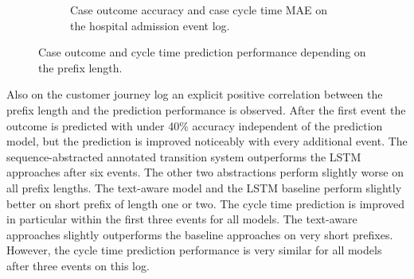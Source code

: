 \begin{figure}[!htbp]
\begin{subfigure}{\textwidth}
		\caption{Case outcome accuracy and case cycle time MAE on the hospital admission event log.}
	\end{subfigure}
	\caption[Case outcome and cycle time prediction performance depending on the prefix length]{Case outcome and cycle time prediction performance depending on the prefix length.}
	\label{fig:outcome-cycle-time-prefix}
\end{figure}


Also on the customer journey log an explicit positive correlation between the prefix length and the prediction performance is observed.
After the first event the outcome is predicted with under 40\% accuracy independent of the prediction model, but the prediction is improved noticeably with every additional event.
The sequence-abstracted annotated transition system outperforms the LSTM approaches after six events.
The other two abstractions perform slightly worse on all prefix lengths.
The text-aware model and the LSTM baseline perform slightly better on short prefix of length one or two.
The cycle time prediction is improved in particular within the first three events for all models.
The text-aware approaches slightly outperforms the baseline approaches on very short prefixes.
However, the cycle time prediction performance is very similar for all models after three events on this log.

